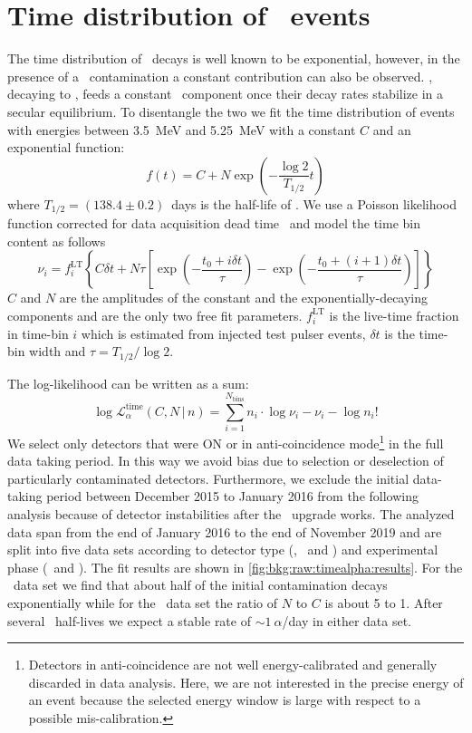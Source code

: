 
\chapter{\texorpdfstring{Time distribution of \a\ events}{Time distribution of alpha-events}}%
\label{apdx:timealpha}

The time distribution of \Po\ decays is well known to be exponential, however, in the
presence of a \Pbl\ contamination a constant contribution can also be observed. \Pbl,
decaying to \Po, feeds a constant \Po\ component once their decay rates stabilize in a
secular equilibrium. To disentangle the two we fit the time distribution of events with
energies between 3.5~MeV and 5.25~MeV with a constant $C$ and an exponential function:
\[
  f(t) = C + N \exp\left( - \frac{\log2}{T_{1/2}}t \right)
\]
where $T_{1/2}=(138.4\pm0.2)$~days is the half-life of \Po. We use a Poisson likelihood
function corrected for data acquisition dead time~\cite{Cleveland1983} and model the time
bin content as follows
\[
  \nu_i = f_i^{\mathrm{LT}}
  \left\{ C \delta t + N \tau
    \left[
      \exp\left( -\frac{t_0 + i \delta t}{\tau} \right)  -
      \exp\left( -\frac{t_0 + (i+1) \delta t}{\tau} \right)
    \right]
  \right\}
\]
$C$ and $N$ are the amplitudes of the constant and the exponentially-decaying components
and are the only two free fit parameters.  $f_i^{\mathrm{LT}}$ is the live-time fraction
in time-bin $i$ which is estimated from injected test pulser events, $\delta t$ is the
time-bin width and $\tau = T_{1/2} / \log2$.

The log-likelihood can be written as a sum:
\[
  \log \mathcal{L}_\alpha^\text{time}(C,N \,|\, n) =
  \sum_{i=1}^{N_\text{bins}} n_i \cdot
  \log\nu_i - \nu_i - \log n_i!
\]
We select only detectors that were ON or in anti-coincidence mode\footnote{%
  Detectors in anti-coincidence are not well energy-calibrated and generally discarded in
  data analysis.  Here, we are not interested in the precise energy of an event because
  the selected energy window is large with respect to a possible mis-calibration.
} in the full data taking period. In this way we avoid bias due to selection or
deselection of particularly contaminated detectors. Furthermore, we exclude the initial
data-taking period between December 2015 to January 2016 from the following analysis
because of detector instabilities after the \phasetwo\ upgrade works. The analyzed data
span from the end of January 2016 to the end of November 2019 and are split into five data
sets according to detector type (\bege, \scoax\ and \icoax) and experimental phase
(\phaseone\ and \phasetwop). The fit results are shown in
\autoref{fig:bkg:raw:timealpha:results}. For the \bege\ data set we find that about half
of the initial contamination decays exponentially while for the \scoax\ data set the ratio
of $N$ to $C$ is about 5 to 1. After several \Po\ half-lives we expect a stable rate of
$\sim1~\alpha$/day in either data set.

